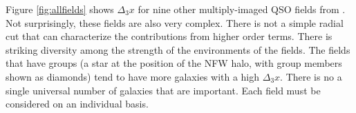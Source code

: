 Figure \ref{fig:allfields} shows $\Delta_3 x$ for nine other multiply-imaged QSO fields from \citet{Wong11}. Not surprisingly, these fields are also very complex. There is not a simple radial cut that can characterize the contributions from higher order terms. There is striking diversity among the strength of the environments of the fields. The fields that have groups (a star at the position of the NFW halo, with group members shown as diamonds) tend to have more galaxies with a high $\Delta_3 x$. There is no a single universal number of galaxies that are important. Each field must be considered on an individual basis.
  
  